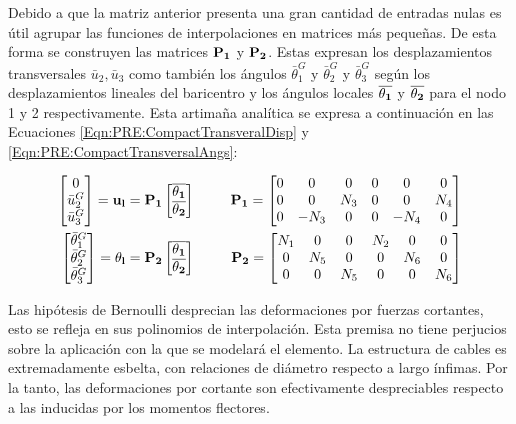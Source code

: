 Debido a que la matriz anterior presenta una gran cantidad de entradas nulas es útil agrupar las funciones de interpolaciones en matrices más pequeñas. De esta forma se construyen las matrices $\bf{P_1}$ y $\bf{P_2}$.  Estas expresan los desplazamientos transversales  $\bar{u}_2, \bar{u}_3 $  como también los ángulos $\bar{\theta}_1^G$  y $\bar{\theta}_2^G$ y $\bar{\theta}_3^G$ según los desplazamientos lineales del baricentro y los ángulos locales  $\overline{\bf{\theta_1}}$ y  $\overline{\bf{\theta_2}}$ para el nodo 1 y 2 respectivamente. Esta artimaña analítica se expresa a continuación en las Ecuaciones \eqref{Eqn:PRE:CompactTransveralDisp} y \eqref{Eqn:PRE:CompactTransversalAngs}:

 
 \begin{eqnarray}
 	\label{Eqn:PRE:CompactTransveralDisp}
		\begin{bmatrix}
			0     \\
		\bar{u}_2^G \\
		\bar{u}_3^G
	\end{bmatrix}=\bf{u_l}=\bf{P}_1
	\begin{bmatrix}
			\overline{\bf{\theta_1}}\\
			\overline{\bf{\theta_2}} 
	\end{bmatrix} &~~~~~ &
	\bf{P}_1 = \begin{bmatrix}
		 0 &   0  & 0 & 0  & 0 & 0 \\
		 0  &  0 & N_3 & 0 & 0 & N_4 \\
		 0  &  -N_3  & 0 & 0 & -N_4 & 0
	\end{bmatrix} \\
	\label{Eqn:PRE:CompactTransversalAngs}
		\begin{bmatrix}
			\bar{\theta}_1^G\\
			\bar{\theta}_2^G \\
			\bar{\theta}_3^G
		\end{bmatrix}=\bf{\theta_l}=\bf{P}_2
		\begin{bmatrix}
			\overline{\bf{\theta_1}}\\
			\overline{\bf{\theta_2}} 
		\end{bmatrix}& ~~~~~ &\bf{P}_2=
	\begin{bmatrix}
	N_1 & 0 & 0 & N_2 & 0 & 0 \\
	0  & N_5 & 0 & 0 &N_6 &0 \\
	0  &  0  & N_5 & 0 & 0 &N_6
	\end{bmatrix}
 \end{eqnarray}

Las hipótesis de Bernoulli desprecian las deformaciones por fuerzas cortantes, esto se refleja en sus polinomios de interpolación. Esta premisa no tiene perjucios sobre la aplicación con la que se modelará el elemento. La estructura de cables es extremadamente esbelta, con relaciones de diámetro respecto a largo ínfimas. Por la tanto, las deformaciones por cortante son efectivamente despreciables respecto a las inducidas por los momentos flectores. 

